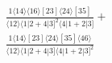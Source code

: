 \documentclass[varwidth, border=5pt]{standalone}
\begin{document}
\begin{my}
$\begin{gathered}
\scriptscriptstyle\frac{1⟨14⟩⟨16⟩[23]⟨24⟩[35]}{⟨12⟩⟨1|2+4|3]^2⟨4|1+2|3]}+\\
\scriptscriptstyle\frac{1⟨14⟩[23]⟨24⟩[35]⟨46⟩}{⟨12⟩⟨1|2+4|3]⟨4|1+2|3]^2}\phantom{+}
\end{gathered}$
\end{my}
\end{document}
